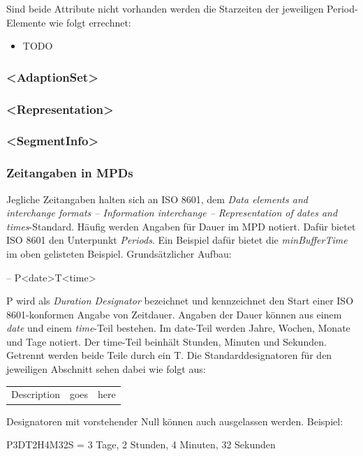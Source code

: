 \documentclass[paper = a4, fontsize = 12pt, parskip = half]{scrartcl} %
\begin{document}
Sind beide Attribute nicht vorhanden werden die Starzeiten der jeweiligen Period-Elemente wie folgt errechnet:

\begin{itemize}
    \item TODO
\end{itemize}

\subsubsection{<AdaptionSet>}
\subsubsection{<Representation>}
\subsubsection{<SegmentInfo>}


\subsubsection{Zeitangaben in MPDs}
\label{iso8601_duration}
Jegliche Zeitangaben halten sich an ISO 8601, dem \textit{Data elements and interchange formats – Information interchange – Representation of dates and times}-Standard. Häufig werden Angaben für Dauer im MPD notiert. Dafür bietet ISO 8601 den Unterpunkt \textit{Periods}. Ein Beispiel dafür bietet die \textit{minBufferTime} im oben gelisteten Beispiel. Grundsätzlicher Aufbau:

-- P<date>T<time>

P wird als \textit{Duration Designator} bezeichnet und kennzeichnet den Start einer ISO 8601-konformen Angabe von Zeitdauer. Angaben der Dauer können aus einem \textit{date} und einem \textit{time}-Teil bestehen. Im date-Teil werden Jahre, Wochen, Monate und Tage notiert. Der time-Teil beinhält Stunden, Minuten und Sekunden. Getrennt werden beide Teile durch ein T. Die Standarddesignatoren für den jeweiligen Abschnitt sehen dabei wie folgt aus:

\begin{center}
    \begin{tabular}{c c c}
         Description & goes & here
    \end{tabular}
\end{center}

Designatoren mit vorstehender Null können auch ausgelassen werden. Beispiel:

P3DT2H4M32S = 3 Tage, 2 Stunden, 4 Minuten, 32 Sekunden
\end{document}
